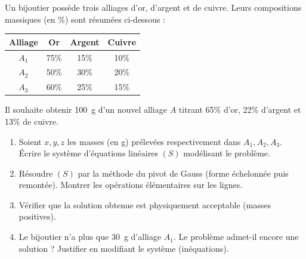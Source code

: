 \documentclass[11pt]{article}
\begin{document}
\begin{exercice}
Un bijoutier possède trois alliages d'or, d'argent et de cuivre. Leurs compositions massiques (en \%) sont résumées ci-dessous :

\begin{center}
\begin{tabular}{|c|c|c|c|}
\hline
Alliage & Or & Argent & Cuivre \\ \hline
$A_1$ & 75\% & 15\% & 10\% \\ \hline
$A_2$ & 50\% & 30\% & 20\% \\ \hline
$A_3$ & 60\% & 25\% & 15\% \\ \hline
\end{tabular}
\end{center}

Il souhaite obtenir \SI{100}{g} d'un nouvel alliage $A$ titrant 65\% d'or, 22\% d'argent et 13\% de cuivre.
\begin{enumerate}
    \item Soient $x, y, z$ les masses (en g) prélevées respectivement dans $A_1, A_2, A_3$. Écrire le système d'équations linéaires $(S)$ modélisant le problème.
    \item Résoudre $(S)$ par la méthode du pivot de Gauss (forme échelonnée puis remontée). Montrer les opérations élémentaires sur les lignes.
    \item Vérifier que la solution obtenue est physiquement acceptable (masses positives).
    \item Le bijoutier n'a plus que \SI{30}{g} d'alliage $A_1$. Le problème admet-il encore une solution ? Justifier en modifiant le système (inéquations).
\end{enumerate}
\end{exercice}
\end{document}
